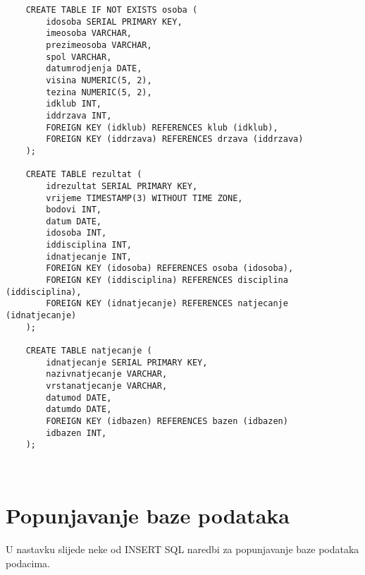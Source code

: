 \documentclass[times, utf8, zavrsni]{fer}
\begin{document}
\begin{lstlisting}
    CREATE TABLE IF NOT EXISTS osoba (
        idosoba SERIAL PRIMARY KEY,
        imeosoba VARCHAR,
        prezimeosoba VARCHAR,
        spol VARCHAR,
        datumrodjenja DATE,
        visina NUMERIC(5, 2),
        tezina NUMERIC(5, 2),
        idklub INT,
        iddrzava INT,
        FOREIGN KEY (idklub) REFERENCES klub (idklub),
        FOREIGN KEY (iddrzava) REFERENCES drzava (iddrzava)
    );

    CREATE TABLE rezultat (
        idrezultat SERIAL PRIMARY KEY,
        vrijeme TIMESTAMP(3) WITHOUT TIME ZONE,
        bodovi INT,
        datum DATE,
        idosoba INT,
        iddisciplina INT,
        idnatjecanje INT,
        FOREIGN KEY (idosoba) REFERENCES osoba (idosoba),
        FOREIGN KEY (iddisciplina) REFERENCES disciplina (iddisciplina),
        FOREIGN KEY (idnatjecanje) REFERENCES natjecanje (idnatjecanje)
    );

    CREATE TABLE natjecanje (
        idnatjecanje SERIAL PRIMARY KEY,
        nazivnatjecanje VARCHAR,
        vrstanatjecanje VARCHAR,
        datumod DATE,
        datumdo DATE,
        FOREIGN KEY (idbazen) REFERENCES bazen (idbazen)
        idbazen INT,
    );



\end{lstlisting}

\section{Popunjavanje baze podataka}
U nastavku slijede neke od INSERT SQL naredbi za popunjavanje baze podataka podacima.
\end{document}
